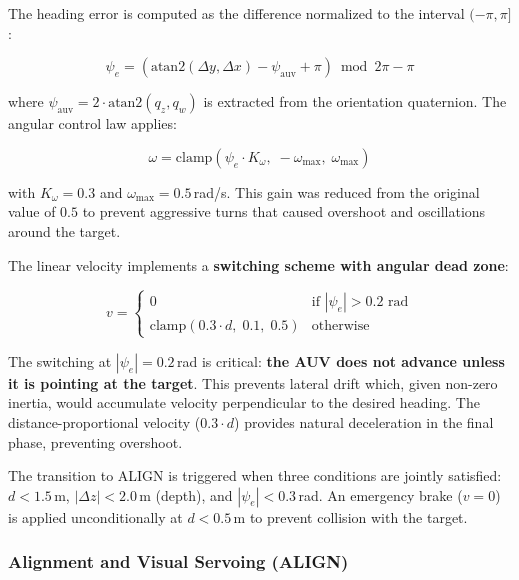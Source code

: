 \documentclass[10pt,twocolumn,letterpaper]{article}
\begin{document}
The heading error is computed as the difference normalized to the interval $(-\pi, \pi]$:

\begin{equation}
\psi_e = \left(\text{atan2}(\Delta y, \Delta x) - \psi_{\text{auv}} + \pi\right) \bmod 2\pi - \pi
\label{eq:heading_error}
\end{equation}

where $\psi_{\text{auv}} = 2 \cdot \text{atan2}(q_z, q_w)$ is extracted from the orientation quaternion. The angular control law applies:

\begin{equation}
\omega = \text{clamp}\left(\psi_e \cdot K_\omega,\; -\omega_{\max},\; \omega_{\max}\right)
\label{eq:approach_angular}
\end{equation}

with $K_\omega = 0.3$ and $\omega_{\max} = 0.5$\,rad/s. This gain was reduced from the original value of $0.5$ to prevent aggressive turns that caused overshoot and oscillations around the target.

The linear velocity implements a \textbf{switching scheme with angular dead zone}:

\begin{equation}
v = \begin{cases}
0 & \text{if } |\psi_e| > 0.2 \text{ rad} \\
\text{clamp}\left(0.3 \cdot d,\; 0.1,\; 0.5\right) & \text{otherwise}
\end{cases}
\label{eq:approach_linear}
\end{equation}

The switching at $|\psi_e| = 0.2$\,rad is critical: \textbf{the AUV does not advance unless it is pointing at the target}. This prevents lateral drift which, given non-zero inertia, would accumulate velocity perpendicular to the desired heading. The distance-proportional velocity ($0.3 \cdot d$) provides natural deceleration in the final phase, preventing overshoot.

The transition to ALIGN is triggered when three conditions are jointly satisfied: $d < 1.5$\,m, $|\Delta z| < 2.0$\,m (depth), and $|\psi_e| < 0.3$\,rad. An emergency brake ($v = 0$) is applied unconditionally at $d < 0.5$\,m to prevent collision with the target.

\subsubsection{Alignment and Visual Servoing (ALIGN)}
\end{document}
